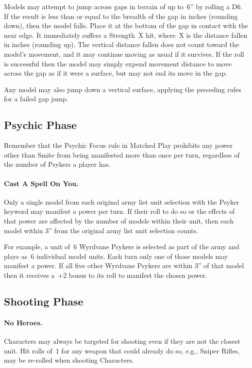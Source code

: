 Models may attempt to jump across gaps in terrain of up to~6'' by
rolling a D6.  If the result is less than or equal to the breadth of
the gap in inches (rounding down), then the model falls.  Place it at
the bottom of the gap in contact with the near edge.  It immediately
suffers a Strength~X hit, where~X is the distance fallen in inches
(rounding up).  The vertical distance fallen does not count toward the
model's movement, and it may continue moving as usual if it survives.
If the roll is successful then the model may simply expend movement
distance to move across the gap as if it were a surface, but may not
end its move in the gap.

Any model may also jump down a vertical surface, applying the
preceding rules for a failed gap jump.

\subsection{Psychic Phase}

Remember that the Psychic Focus rule in Matched Play prohibits any
power other than Smite from being manifested more than once per turn,
regardless of the number of Psykers a player has.

\paragraph{Cast A Spell On You.}

Only a single model from each original army list unit selection with
the Psyker keyword may manifest a power per turn.  If their roll to do
so or the effects of that power are affected by the number of models
within their unit, then each model within 3'' from the original army
list unit selection counts.

For example, a unit of~6 Wyrdvane Psykers is selected as part of the
army and plays as~6 individual model units.  Each turn only one of
those models may manifest a power.  If all five other Wyrdvane Psykers
are within 3'' of that model then it receives a~+2 bonus to its roll
to manifest the chosen power.

\subsection{Shooting Phase}

\paragraph{No Heroes.} Characters may always be targeted for shooting
even if they are not the closest unit.  Hit rolls of~1 for any weapon
that could already do so, e.g., Sniper Rifles, may be re-rolled when
shooting Characters.

